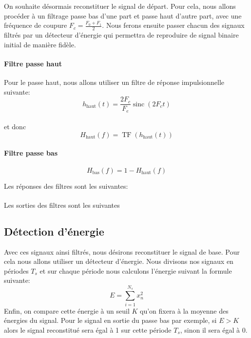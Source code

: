 \documentclass{article}
\newcommand{\TF}{\operatorname{TF}}
\newcommand{\sinc}{\operatorname{sinc}}
\begin{document}
On souhaite désormais reconstituer le signal de départ. Pour cela, nous allons procéder à un filtrage passe bas d'une part et passe haut d'autre part, avec une fréquence de coupure $F_c=\frac{F_0+F_1}{2}$. Nous ferons ensuite passer chacun des signaux filtrés par un détecteur d'énergie qui permettra de reproduire de signal binaire initial de manière fidèle.

\paragraph{Filtre passe haut}
Pour le passe haut, nous allons utiliser un filtre de réponse impulsionnelle suivante:
\[
h_\text{haut}(t) = \frac{2 F_c}{F_e} \sinc(2 F_c t)
\]
\\
et donc \[H_\text{haut}(f) = \TF(h_\text{haut}(t))
\]

\paragraph{Filtre passe bas}

\[
H_\text{bas}(f) = 1-H_\text{haut}(f)
\]

Les réponses des filtres sont les suivantes:


\paragraph{}


Les sorties des filtres sont les suivantes


\subsection{Détection d'énergie}


Avec ces signaux ainsi filtrés, nous désirons reconstituer le signal de base. Pour cela nous allons utiliser un détecteur d'énergie.
Nous divisons nos signaux en périodes $T_s$ et sur chaque période nous calculons l'énergie suivant la formule suivante:
\[
E=\sum_{i=1}^{N_s} x_n^2
\]
Enfin, on compare cette énergie à un seuil $K$ qu'on fixera à la moyenne des énergies du signal.
Pour le signal en sortie du passe bas par exemple, si $E>K$ alors le signal reconstitué sera égal à 1 sur cette période $T_s$, sinon il sera égal à 0.
\end{document}

